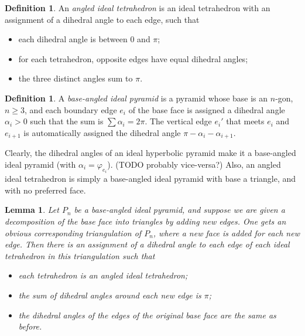 \documentclass[11pt]{amsart}
\newcommand{\vphi}{\varphi}
\theoremstyle{plain}
\newtheorem{lemma}[theorem]{Lemma}
\theoremstyle{definition}
\newtheorem{define}[theorem]{Definition}
\begin{document}
\begin{define}
An \emph{angled ideal tetrahedron} is an ideal tetrahedron with an assignment of a dihedral angle
to each edge, such that
\begin{itemize}
\item each dihedral angle is between 0 and $\pi$;
\item for each tetrahedron, opposite edges have equal dihedral angles;
\item the three distinct angles sum to $\pi$.
\end{itemize}
\end{define}


\begin{define}
A \emph{base-angled ideal pyramid}
is a pyramid whose base is an $n$-gon, $n \geq 3$,
and each boundary edge $e_i$ of the base face is assigned a dihedral angle
$\alpha_i > 0$ such that the sum is $\sum \alpha_i = 2\pi$.
The vertical edge $e_i'$ that meets $e_i$ and $e_{i+1}$
is automatically assigned the dihedral angle $\pi - \alpha_i - \alpha_{i+1}$.
\end{define}

Clearly, the dihedral angles of an ideal hyperbolic pyramid
make it a base-angled ideal pyramid
(with $\alpha_i = \vphi_{e_i}$).
(TODO probably vice-versa?)
Also, an angled ideal tetrahedron is simply a base-angled ideal pyramid
with base a triangle, and with no preferred face.

\begin{lemma}
Let $P_n$ be a base-angled ideal pyramid, and suppose we are given a
decomposition of the base face into triangles by adding new edges.  One gets an
obvious corresponding triangulation of $P_n$, where a new face is added for each
new edge. Then there is an assignment of a dihedral angle to each edge of each
ideal tetrahedron in this triangulation such that
\begin{itemize}
\item each tetrahedron is an angled ideal tetrahedron;
\item the sum of dihedral angles around each new edge is $\pi$;
\item the dihedral angles of the edges of the original base face are the same as
	before.
\end{itemize} 
\end{lemma}
\end{document}
